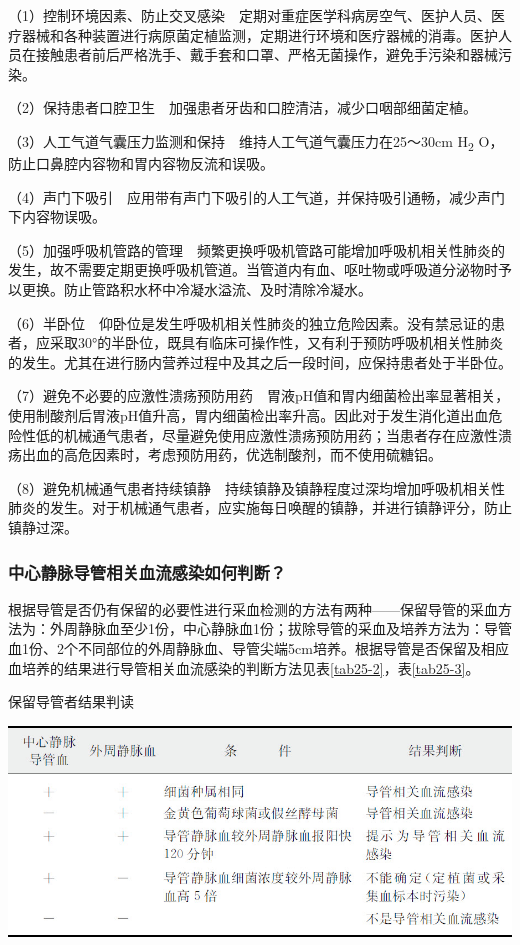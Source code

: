 （1）控制环境因素、防止交叉感染　定期对重症医学科病房空气、医护人员、医疗器械和各种装置进行病原菌定植监测，定期进行环境和医疗器械的消毒。医护人员在接触患者前后严格洗手、戴手套和口罩、严格无菌操作，避免手污染和器械污染。

（2）保持患者口腔卫生　加强患者牙齿和口腔清洁，减少口咽部细菌定植。

（3）人工气道气囊压力监测和保持　维持人工气道气囊压力在25～30cm
H\textsubscript{2} O，防止口鼻腔内容物和胃内容物反流和误吸。

（4）声门下吸引　应用带有声门下吸引的人工气道，并保持吸引通畅，减少声门下内容物误吸。

（5）加强呼吸机管路的管理　频繁更换呼吸机管路可能增加呼吸机相关性肺炎的发生，故不需要定期更换呼吸机管道。当管道内有血、呕吐物或呼吸道分泌物时予以更换。防止管路积水杯中冷凝水溢流、及时清除冷凝水。

（6）半卧位　仰卧位是发生呼吸机相关性肺炎的独立危险因素。没有禁忌证的患者，应采取30°的半卧位，既具有临床可操作性，又有利于预防呼吸机相关性肺炎的发生。尤其在进行肠内营养过程中及其之后一段时间，应保持患者处于半卧位。

（7）避免不必要的应激性溃疡预防用药　胃液pH值和胃内细菌检出率显著相关，使用制酸剂后胃液pH值升高，胃内细菌检出率升高。因此对于发生消化道出血危险性低的机械通气患者，尽量避免使用应激性溃疡预防用药；当患者存在应激性溃疡出血的高危因素时，考虑预防用药，优选制酸剂，而不使用硫糖铝。

（8）避免机械通气患者持续镇静　持续镇静及镇静程度过深均增加呼吸机相关性肺炎的发生。对于机械通气患者，应实施每日唤醒的镇静，并进行镇静评分，防止镇静过深。

\subsubsection{中心静脉导管相关血流感染如何判断？}

根据导管是否仍有保留的必要性进行采血检测的方法有两种------保留导管的采血方法为：外周静脉血至少1份，中心静脉血1份；拔除导管的采血及培养方法为：导管血1份、2个不同部位的外周静脉血、导管尖端5cm培养。根据导管是否保留及相应血培养的结果进行导管相关血流感染的判断方法见表\ref{tab25-2}，表\ref{tab25-3}。

\begin{table}[htbp]
\centering
\caption{保留导管者结果判读}
\label{tab25-2}
\includegraphics{./images/Image00297.jpg}
\end{table}

